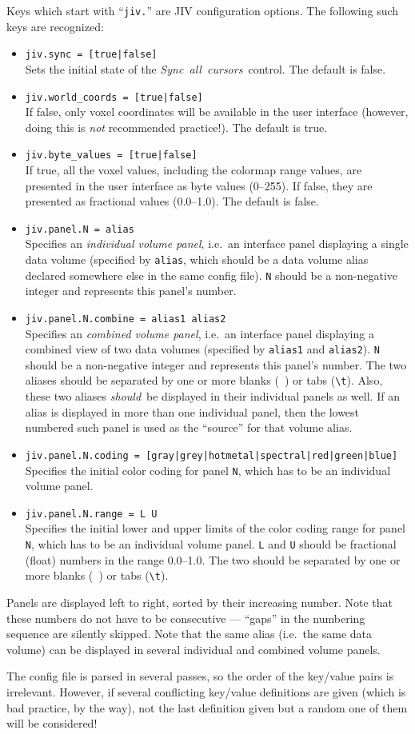 Keys which start with ``\verb+jiv.+'' are JIV configuration
options. The following such keys are recognized:
\begin{itemize}
\item \verb+jiv.sync = [true|false]+ \\
  Sets the initial state of the \mbox{\em Sync all cursors}\ control.
  The default is false.
\item \verb+jiv.world_coords = [true|false]+ \\
  If false, only voxel coordinates will be available in the user
  interface (however, doing this is \emph{not} recommended practice!).
  The default is true.
\item \verb+jiv.byte_values = [true|false]+ \\
  If true, all the voxel values, including the colormap range values,
  are presented in the user interface as byte values (0--255). If
  false, they are presented as fractional values (0.0--1.0). The
  default is false.
\item \verb+jiv.panel.N = alias+ \\
  Specifies an {\em individual volume panel}, i.e.\ an interface panel
  displaying a single data volume (specified by \verb+alias+, which
  should be a data volume alias declared somewhere else in the same
  config file).  \verb+N+ should be a non-negative integer and
  represents this panel's number.
\item \verb+jiv.panel.N.combine = alias1 alias2+ \\
  Specifies an {\em combined volume panel}, i.e.\ an interface panel
  displaying a combined view of two data volumes (specified by
  \verb+alias1+ and \verb+alias2+). \verb+N+ should be a non-negative
  integer and represents this panel's number. The two aliases should
  be separated by one or more blanks (\verb*+ +) or tabs (\verb+\t+).
  Also, these two aliases {\em should}\ be displayed in their
  individual panels as well. If an alias is displayed in more than one
  individual panel, then the lowest numbered such panel is used as the
  ``source'' for that volume alias.
\item \verb+jiv.panel.N.coding = [gray|grey|hotmetal|spectral|red|green|blue]+ \\
  Specifies the initial color coding for panel \verb+N+, which has to
  be an individual volume panel.
\item \verb+jiv.panel.N.range = L U+ \\
  Specifies the initial lower and upper limits of the color coding
  range for panel \verb+N+, which has to be an individual volume
  panel. \verb+L+ and \verb+U+ should be fractional (float) numbers in
  the range 0.0--1.0.  The two should be separated by one or more
  blanks (\verb*+ +) or tabs (\verb+\t+).
\end{itemize}
Panels are displayed left to right, sorted by their increasing number.
Note that these numbers do not have to be consecutive --- ``gaps'' in
the numbering sequence are silently skipped.  Note that the same alias
(i.e.\ the same data volume) can be displayed in several individual
and combined volume panels.

The config file is parsed in several passes, so the order of the
key/value pairs is irrelevant. However, if several conflicting
key/value definitions are given (which is bad practice, by the way),
not the last definition given but a random one of them will be
considered!


